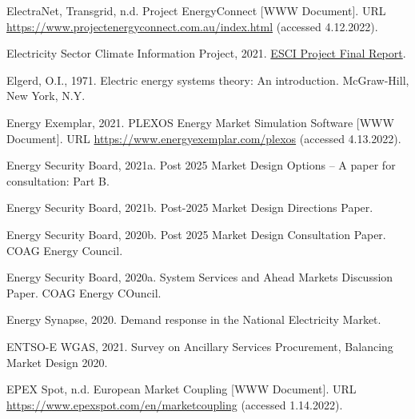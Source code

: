 \documentclass[12pt,a4paper,]{report}
\newlength{\cslhangindent}
\newenvironment{CSLReferences}[2] %
 {%
  \setlength{\parindent}{0pt}
  \ifodd #1 \everypar{\setlength{\hangindent}{\cslhangindent}}\ignorespaces\fi
  \ifnum #2 > 0
  \setlength{\parskip}{#2\baselineskip}
  \fi
 }%
 {}
\begin{document}
\begin{CSLReferences}{1}{0}
\leavevmode{}%
ElectraNet, Transgrid, n.d. Project {EnergyConnect} {[}WWW Document{]}.
URL \url{https://www.projectenergyconnect.com.au/index.html} (accessed
4.12.2022).

\leavevmode{}%
Electricity Sector Climate Information Project, 2021.
\href{https://www.climatechangeinaustralia.gov.au/media/ccia/2.2/cms_page_media/799/ESCI\%20Project\%20final\%20report_210721.pdf}{{ESCI
Project Final Report}}.

\leavevmode{}%
Elgerd, O.I., 1971. Electric energy systems theory: An introduction.
{McGraw-Hill}, {New York, N.Y}.

\leavevmode{}%
Energy Exemplar, 2021. {PLEXOS} \textbar{} {Energy Market Simulation
Software} {[}WWW Document{]}. URL
\url{https://www.energyexemplar.com/plexos} (accessed 4.13.2022).

\leavevmode{}%
Energy Security Board, 2021a. Post 2025 {Market Design Options} -- {A}
paper for consultation: {Part B}.

\leavevmode{}%
Energy Security Board, 2021b. Post-2025 {Market Design Directions
Paper}.

\leavevmode{}%
Energy Security Board, 2020b. Post 2025 {Market Design Consultation
Paper}. {COAG Energy Council}.

\leavevmode{}%
Energy Security Board, 2020a. System {Services} and {Ahead Markets
Discussion Paper}. {COAG Energy COuncil}.

\leavevmode{}%
Energy Synapse, 2020. Demand response in the {National Electricity
Market}.

\leavevmode{}%
ENTSO-E WGAS, 2021. Survey on {Ancillary Services Procurement},
{Balancing Market Design} 2020.

\leavevmode{}%
EPEX Spot, n.d. European {Market Coupling} {[}WWW Document{]}. URL
\url{https://www.epexspot.com/en/marketcoupling} (accessed 1.14.2022).


\end{CSLReferences}
\end{document}
